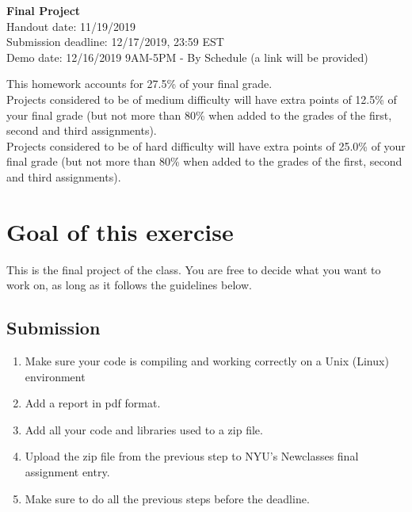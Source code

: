 \documentclass[11pt]{article}
\begin{document}
\hspace{50pt}

\begin{center}

{\Huge \textbf{Final Project}}\\
\vspace{10pt}
Handout date: 11/19/2019\\
Submission deadline: 12/17/2019,  23:59 EST\\
Demo date: 12/16/2019 9AM-5PM - By Schedule (a link will be provided)
\end{center}

\noindent This homework accounts for 27.5\% of your final grade.\\
\noindent Projects considered to be of medium difficulty will have extra points of 12.5\% of your final grade (but not more than 80\% when added to the grades of the first, second and third assignments).\\
\noindent Projects considered to be of hard difficulty will have extra points of 25.0\% of your final grade (but not more than 80\% when added to the grades of the first, second and third assignments).
 

\section*{Goal of this exercise}
This is the final project of the class. You are free to decide what you want to work on, as long as it follows the guidelines below.

\subsection*{Submission}

\begin{enumerate}
\item Make sure your code is compiling and working correctly on a Unix (Linux) environment
\item Add a report in pdf format.
\item Add all your code and libraries used to a zip file. 
\item Upload the zip file from the previous step to NYU's Newclasses final assignment entry.
\item Make sure to do all the previous steps before the deadline.

\end{enumerate}
\end{document}
